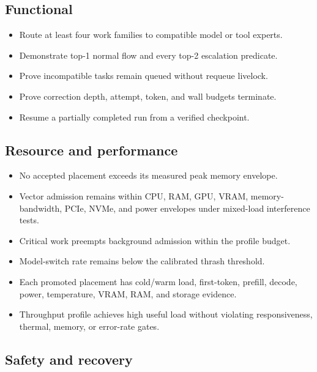 \documentclass[11pt,letterpaper]{article}
\begin{document}
\subsection{Functional}

\begin{itemize}
  \item Route at least four work families to compatible model or tool experts.
  \item Demonstrate top-1 normal flow and every top-2 escalation predicate.
  \item Prove incompatible tasks remain queued without requeue livelock.
  \item Prove correction depth, attempt, token, and wall budgets terminate.
  \item Resume a partially completed run from a verified checkpoint.
\end{itemize}

\subsection{Resource and performance}

\begin{itemize}
  \item No accepted placement exceeds its measured peak memory envelope.
  \item Vector admission remains within CPU, RAM, GPU, VRAM, memory-bandwidth,
        PCIe, NVMe, and power envelopes under mixed-load interference tests.
  \item Critical work preempts background admission within the profile budget.
  \item Model-switch rate remains below the calibrated thrash threshold.
  \item Each promoted placement has cold/warm load, first-token, prefill,
        decode, power, temperature, VRAM, RAM, and storage evidence.
  \item Throughput profile achieves high useful load without violating
        responsiveness, thermal, memory, or error-rate gates.
\end{itemize}

\subsection{Safety and recovery}
\end{document}
